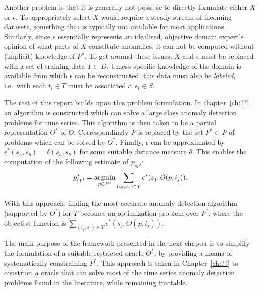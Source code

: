 Another problem is that it is generally not possible to directly formulate either $X$ or $\epsilon$. To appropriately select $X$ would require a steady stream of incoming datasets, something that is typically not available for most applications. Similarly, since $\epsilon$ essentially represents an idealised, objective domain expert's opinion of what parts of $X$ constitute anomalies, it can not be computed without (implicit) knowledge of $P^o$. To get around these issues, $X$ and $\epsilon$ must be replaced with a set of training data $T \subset D$. Unless specific knowledge of the domain is available from which $\epsilon$ can be reconstructed, this data must also be \emph{labeled}, i.e.\ with each $t_i \in T$ must be associated a $s_i \in S$.

The rest of this report builds upon this problem formulation. In chapter~\ref{ch:??}, an algorithm is constructed which can solve a large class anomaly detection problems for time series. This algorithm is then taken to be a partial representation $O^*$ of $O$. Correspondingly $P$ is replaced by the set $P^* \subset P$ of problems which can be solved by $O^*$. Finally, $\epsilon$ can be approximated by $\epsilon^*(s_a, s_b) = \delta(s_a, s_b)$ for some suitable distance measure $\delta$. This enables the computation of the following estimate of $p_{opt}$:
\[
    p^*_{opt} = \argmin_{p \in P^*} \sum_{(i_j, s_j) \in T} \epsilon^*(s_j, O(p, i_j)).
\]

With this approach, finding the most accurate anomaly detection algorithm (supported by $O^*$) for $T$ becomes an optimization problem over $P^*$, where the objective function is $\sum_{(i_j, s_j) \in T} \epsilon^*(s_j, O(p, i_j))$.

The main purpose of the framework presented in the next chapter is to simplify the formulation of a suitable restricted oracle $O^*$, by providing a means of systematically constraining $P^*$. This approach is taken in Chapter~\ref{ch:??} to construct a oracle that can solve most of the time series anomaly detection problems found in the literature, while remaining tractable.
